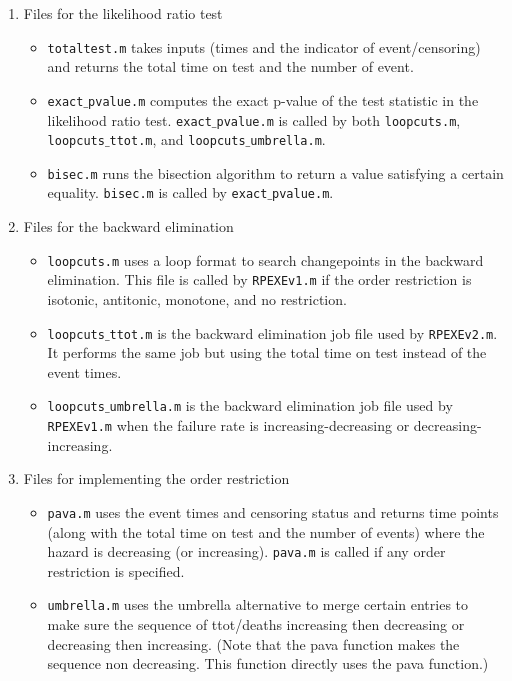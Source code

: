 \documentclass[12pt] {article}
\begin{document}
\begin{enumerate}
\item Files for the likelihood ratio test
\begin{itemize}
\item {\tt totaltest.m} takes inputs (times and the indicator of event/censoring) and returns the total time on test and the number of event.

\item {\tt exact$\_$pvalue.m} computes the exact p-value of the test statistic
    in the likelihood ratio test. {\tt exact$\_$pvalue.m} is called by both
    {\tt loopcuts.m}, {\tt loopcuts$\_$ttot.m}, and {\tt loopcuts$\_$umbrella.m}.

\item {\tt bisec.m} runs the bisection algorithm to return a value satisfying
    a certain equality. {\tt bisec.m} is called by {\tt exact$\_$pvalue.m}.
\end{itemize}

\item Files for the backward elimination
\begin{itemize}
\item {\tt loopcuts.m} uses a loop format to search changepoints in the backward elimination. This file is called by {\tt RPEXEv1.m} if the order restriction
    is isotonic, antitonic, monotone, and no restriction.

\item {\tt loopcuts$\_$ttot.m} is the backward elimination job file used by {\tt RPEXEv2.m}. It performs the same job but using the total time on test instead of the event times.

\item {\tt loopcuts$\_$umbrella.m} is the backward elimination job file
    used by {\tt RPEXEv1.m} when the failure rate is increasing-decreasing or
    decreasing-increasing.
\end{itemize}

\item Files for implementing the order restriction
\begin{itemize}
\item {\tt pava.m} uses the event times and censoring status and returns time points (along with the total time on test and the number of events) where the hazard is decreasing (or increasing). {\tt pava.m} is called if any order restriction is specified.

\item {\tt umbrella.m} uses the umbrella alternative to merge certain entries to make sure the sequence of ttot/deaths increasing then decreasing or decreasing then increasing. (Note that the pava function makes the sequence non decreasing.  This function directly uses the pava function.)


\end{itemize}
\end{enumerate}
\end{document}
